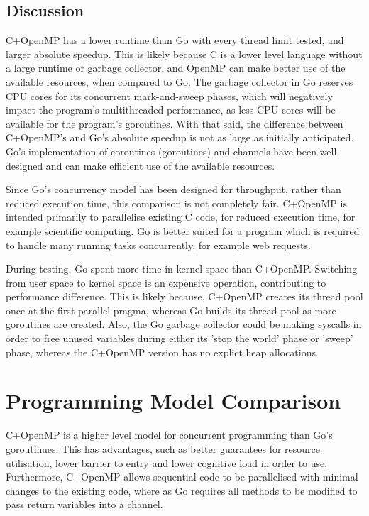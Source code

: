 \documentclass[11pt,a4paper,titlepage]{article}
\begin{document}
\FloatBarrier
\subsection{Discussion}
C+OpenMP has a lower runtime than Go with every thread limit tested, and larger absolute speedup.
This is likely because C is a lower level language without a large runtime or garbage collector, and OpenMP can make better use of the available resources, when compared to Go.
The garbage collector in Go reserves CPU cores for its concurrent mark-and-sweep phases, which will negatively impact the program's multithreaded performance, as less CPU cores will be available for the program's goroutines.
With that said, the difference between C+OpenMP's and Go's absolute speedup is not as large as initially anticipated.
Go's implementation of coroutines (goroutines) and channels have been well designed and can make efficient use of the available resources.

Since Go's concurrency model has been designed for throughput, rather than reduced execution time, this comparison is not completely fair.
C+OpenMP is intended primarily to parallelise existing C code, for reduced execution time, for example scientific computing.
Go is better suited for a program which is required to handle many running tasks concurrently, for example web requests.

During testing, Go spent more time in kernel space than C+OpenMP.
Switching from user space to kernel space is an expensive operation, contributing to performance difference.
This is likely because, C+OpenMP creates its thread pool once at the first parallel pragma, whereas Go builds its thread pool as more goroutines are created.
Also, the Go garbage collector could be making syscalls in order to free unused variables during either its 'stop the world' phase or 'sweep' phase, whereas the C+OpenMP version has no explict heap allocations.

\section{Programming Model Comparison}
C+OpenMP is a higher level model for concurrent programming than Go's goroutinues.
This has advantages, such as better guarantees for resource utilisation, lower barrier to entry and lower cognitive load in order to use.
Furthermore, C+OpenMP allows sequential code to be parallelised with minimal changes to the existing code, where as Go requires all methods to be modified to pass return variables into a channel.
\end{document}
